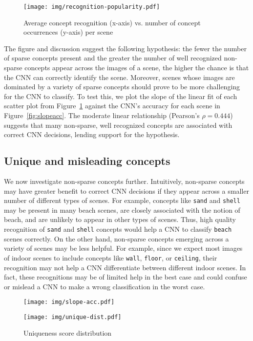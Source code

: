 \documentclass{article}
\begin{document}
\begin{figure}[h]
  \texttt{[image: img/recognition-popularity.pdf]}
   \caption{Average concept recognition (x-axis) vs. number of concept occurrences 
  (y-axis) per scene }
  \label{fig:recpop}
\end{figure}

The figure and discussion suggest the following hypothesis:
the fewer the number of sparse concepts present and the 
greater the number of well recognized non-sparse concepts appear across the images of a scene, the higher the chance is that the CNN can correctly identify the scene. Moreover, scenes whose images are 
dominated by a variety of sparse concepts should prove to be more challenging for the CNN to classify.
To test this, we plot 
the slope of the linear fit of each scatter plot from Figure~\ref{fig:recpop} against the CNN's 
accuracy for each scene in Figure~\ref{fig:slopeacc}. The
moderate linear relationship (Pearson's $\rho = 0.444$) suggests that many non-sparse, well recognized
concepts are associated with correct CNN decisions, lending support for the hypothesis.

\subsection{Unique and misleading concepts}
We now investigate non-sparse concepts further. Intuitively, non-sparse concepts may have greater
benefit to correct CNN decisions if they appear across a smaller
number of different types of scenes. For example, concepts
like \texttt{sand} and \texttt{shell} may be present 
in many beach scenes, are closely associated with the notion of beach, and are unlikely to 
appear in other types of scenes. Thus, 
high quality recognition of \texttt{sand} and \texttt{shell}
concepts would help a CNN to classify \texttt{beach} scenes correctly. On the other hand, 
non-sparse concepts emerging across a variety of scenes may be less helpful. For example, 
since we expect most images of indoor scenes 
to include concepts like \texttt{wall}, \texttt{floor}, or \texttt{ceiling}, their recognition 
may not help a CNN differentiate between different indoor scenes. In fact, these recognitions
may be of limited help in the best case and could confuse or mislead a CNN to make a wrong 
classification in the worst case. 

\begin{figure}
\centering
\begin{minipage}{.46\textwidth}
\vspace{6px}
  \texttt{[image: img/slope-acc.pdf]}
\caption{Slope of sparse concept recognition (Figure~\ref{fig:recpop}) vs CNN's accuracy}
\label{fig:slopeacc}
\end{minipage}%
\hspace{20px}
\begin{minipage}{.48\textwidth}
\texttt{[image: img/unique-dist.pdf]}
\caption{Uniqueness score distribution}
\label{fig:uniquedist}
\end{minipage}
\end{figure}
\end{document}

